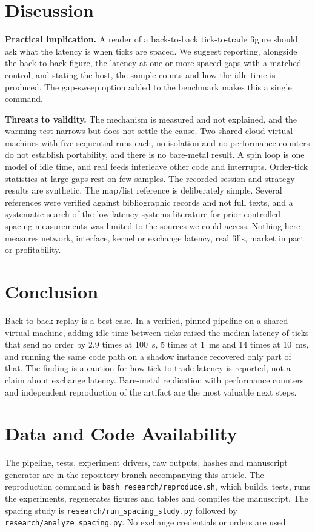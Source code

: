 \documentclass{ieeeaccess}
\begin{document}
\section{Discussion}
\label{sec:discussion}
\textbf{Practical implication.} A reader of a back-to-back tick-to-trade figure should ask what the latency is when ticks are spaced. We suggest reporting, alongside the back-to-back figure, the latency at one or more spaced gaps with a matched control, and stating the host, the sample counts and how the idle time is produced. The gap-sweep option added to the benchmark makes this a single command.

\textbf{Threats to validity.} The mechanism is measured and not explained, and the warming test narrows but does not settle the cause. Two shared cloud virtual machines with five sequential runs each, no isolation and no performance counters do not establish portability, and there is no bare-metal result. A spin loop is one model of idle time, and real feeds interleave other code and interrupts. Order-tick statistics at large gaps rest on few samples. The recorded session and strategy results are synthetic. The map/list reference is deliberately simple. Several references were verified against bibliographic records and not full texts, and a systematic search of the low-latency systems literature for prior controlled spacing measurements was limited to the sources we could access. Nothing here measures network, interface, kernel or exchange latency, real fills, market impact or profitability.

\section{Conclusion}
\label{sec:conclusion}
Back-to-back replay is a best case. In a verified, pinned pipeline on a shared virtual machine, adding idle time between ticks raised the median latency of ticks that send no order by 2.9 times at 100~\textmu s, 5 times at 1~ms and 14 times at 10~ms, and running the same code path on a shadow instance recovered only part of that. The finding is a caution for how tick-to-trade latency is reported, not a claim about exchange latency. Bare-metal replication with performance counters and independent reproduction of the artifact are the most valuable next steps.

\section*{Data and Code Availability}
The pipeline, tests, experiment drivers, raw outputs, hashes and manuscript generator are in the repository branch accompanying this article. The reproduction command is \texttt{bash research/reproduce.sh}, which builds, tests, runs the experiments, regenerates figures and tables and compiles the manuscript. The spacing study is \texttt{research/run\_spacing\_study.py} followed by \texttt{research/analyze\_spacing.py}. No exchange credentials or orders are used.
\end{document}
